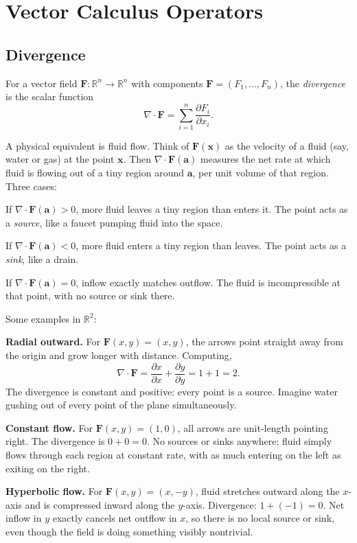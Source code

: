 \documentclass{article}
\begin{document}
\section{Vector Calculus Operators}
  
\subsection{Divergence}
 
For a vector field $\mathbf{F}: \mathbb{R}^n \to \mathbb{R}^n$ with components $\mathbf{F} = (F_1, \ldots, F_n)$, the \textit{divergence} is the scalar function
$$\nabla \cdot \mathbf{F} = \sum_{i=1}^n \frac{\partial F_i}{\partial x_i}.$$
 
A physical equivalent is fluid flow. Think of $\mathbf{F}(\mathbf{x})$ as the velocity of a fluid (say, water or gas) at the point $\mathbf{x}$. Then $\nabla \cdot \mathbf{F}(\mathbf{a})$ measures the net rate at which fluid is flowing out of a tiny region around $\mathbf{a}$, per unit volume of that region. Three cases:
 
If $\nabla \cdot \mathbf{F}(\mathbf{a}) > 0$, more fluid leaves a tiny region than enters it. The point acts as a \textit{source}, like a faucet pumping fluid into the space.
 
If $\nabla \cdot \mathbf{F}(\mathbf{a}) < 0$, more fluid enters a tiny region than leaves. The point acts as a \textit{sink}, like a drain.
 
If $\nabla \cdot \mathbf{F}(\mathbf{a}) = 0$, inflow exactly matches outflow. The fluid is incompressible at that point, with no source or sink there.
 
Some examples in $\mathbb{R}^2$:
 
\textbf{Radial outward.} For $\mathbf{F}(x, y) = (x, y)$, the arrows point straight away from the origin and grow longer with distance. Computing,
$$\nabla \cdot \mathbf{F} = \frac{\partial x}{\partial x} + \frac{\partial y}{\partial y} = 1 + 1 = 2.$$
The divergence is constant and positive: every point is a source. Imagine water gushing out of every point of the plane simultaneously.
 
\textbf{Constant flow.} For $\mathbf{F}(x, y) = (1, 0)$, all arrows are unit-length pointing right. The divergence is $0 + 0 = 0$. No sources or sinks anywhere; fluid simply flows through each region at constant rate, with as much entering on the left as exiting on the right.
 
\textbf{Hyperbolic flow.} For $\mathbf{F}(x, y) = (x, -y)$, fluid stretches outward along the $x$-axis and is compressed inward along the $y$-axis. Divergence: $1 + (-1) = 0$. Net inflow in $y$ exactly cancels net outflow in $x$, so there is no local source or sink, even though the field is doing something visibly nontrivial.
 
\end{document}
